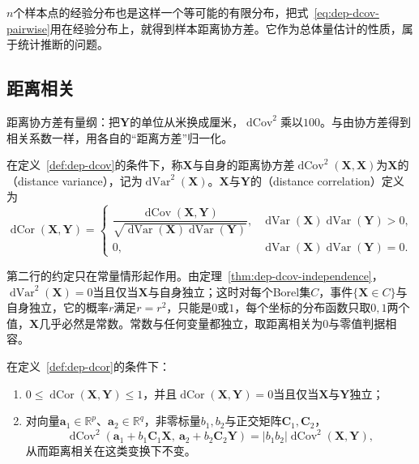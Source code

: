 $n$个样本点的经验分布也是这样一个等可能的有限分布，把式~\eqref{eq:dep-dcov-pairwise}用在经验分布上，就得到样本距离协方差。它作为总体量估计的性质，属于统计推断的问题。

\subsection{距离相关}
\label{sec:dep-dcor}

距离协方差有量纲：把$\bm{Y}$的单位从米换成厘米，$\operatorname{dCov}^{2}$乘以$100$。与由协方差得到相关系数一样，用各自的“距离方差”归一化。

\begin{definition}[距离相关]
\label{def:dep-dcor}
在定义~\ref{def:dep-dcov}的条件下，称$\bm{X}$与自身的距离协方差$\operatorname{dCov}^{2}(\bm{X},\bm{X})$为$\bm{X}$的（distance variance），记为$\operatorname{dVar}^{2}(\bm{X})$。$\bm{X}$与$\bm{Y}$的（distance correlation）定义为
\begin{equation}
  \operatorname{dCor}(\bm{X},\bm{Y})=
  \begin{cases}
    \dfrac{\operatorname{dCov}(\bm{X},\bm{Y})}{\sqrt{\operatorname{dVar}(\bm{X})\operatorname{dVar}(\bm{Y})}}, & \operatorname{dVar}(\bm{X})\operatorname{dVar}(\bm{Y})>0,\\
    0, & \operatorname{dVar}(\bm{X})\operatorname{dVar}(\bm{Y})=0 .
  \end{cases}
  \label{eq:dep-dcor}
\end{equation}
\end{definition}

第二行的约定只在常量情形起作用。由定理~\ref{thm:dep-dcov-independence}，$\operatorname{dVar}^{2}(\bm{X})=0$当且仅当$\bm{X}$与自身独立；这时对每个Borel集$C$，事件$\{\bm{X}\in C\}$与自身独立，它的概率$r$满足$r=r^{2}$，只能是$0$或$1$，每个坐标的分布函数只取$0,1$两个值，$\bm{X}$几乎必然是常数。常数与任何变量都独立，取距离相关为$0$与零值判据相容。

\begin{theorem}[距离相关的范围与不变性]
\label{thm:dep-dcor-properties}
在定义~\ref{def:dep-dcor}的条件下：
\begin{enumerate}
  \item $0\leq\operatorname{dCor}(\bm{X},\bm{Y})\leq1$，并且$\operatorname{dCor}(\bm{X},\bm{Y})=0$当且仅当$\bm{X}$与$\bm{Y}$独立；
  \item 对向量$\bm{a}_1\in\mathbb{R}^{p}$、$\bm{a}_2\in\mathbb{R}^{q}$，非零标量$b_1,b_2$与正交矩阵$\bm{C}_1,\bm{C}_2$，
  \begin{equation}
    \operatorname{dCov}^{2}(\bm{a}_1+b_1\bm{C}_1\bm{X},\ \bm{a}_2+b_2\bm{C}_2\bm{Y})=\lvert b_1b_2\rvert\operatorname{dCov}^{2}(\bm{X},\bm{Y}),
    \label{eq:dep-dcov-scaling}
  \end{equation}
  从而距离相关在这类变换下不变。
\end{enumerate}
\end{theorem}

